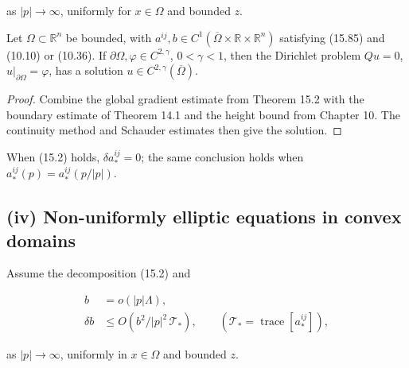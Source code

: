 as \(|p|\to\infty\), uniformly for \(x\in\Omega\) and bounded \(z\).

\medskip

\begin{theorem}\label{gilbarg-trudinger.thm.15.13.general-domain-existence}
Let \(\Omega\subset\mathbb R^n\) be bounded, with
\(a^{ij},b\in C^1(\overline\Omega\times\mathbb R\times\mathbb R^n)\) satisfying
(15.85) and (10.10) or (10.36). If
\(\partial\Omega,\varphi\in C^{2,\gamma}\), \(0<\gamma<1\), then the
Dirichlet problem \(Qu=0\), \(u|_{\partial\Omega}=\varphi\), has a solution
\(u\in C^{2,\gamma}(\overline\Omega)\).
\end{theorem}
\begin{proof}
\sketch Combine the global gradient estimate from Theorem 15.2 with the
boundary estimate of Theorem 14.1 and the height bound from Chapter 10.
The continuity method and Schauder estimates then give the solution.
\end{proof}

\medskip

When (15.2) holds, \(\delta a_*^{ij}=0\); the same conclusion holds when
\(a_*^{ij}(p)=a_*^{ij}(p/|p|)\).

\medskip

\subsection*{(iv) Non-uniformly elliptic equations in convex domains}
Assume the decomposition (15.2) and

\begin{equation}\tag{15.86}
\begin{aligned}
b &= o(|p|\Lambda), \\
\delta b &\leq O\!\left(b^2/|p|^2\,\mathcal{T}_*\right), \qquad (\mathcal{T}_* = \operatorname{trace}[a_*^{ij}]),
\end{aligned}
\end{equation}

as \(|p|\to\infty\), uniformly in \(x\in\Omega\) and bounded \(z\).

\medskip

